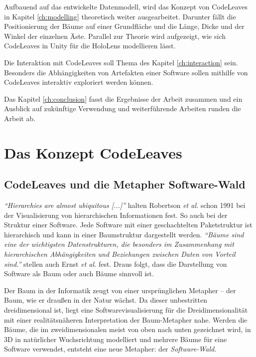 Aufbauend auf das entwickelte Datenmodell, wird das Konzept von CodeLeaves in Kapitel \ref{ch:modelling} theoretisch weiter ausgearbeitet. Darunter fällt die Positionierung der Bäume auf einer Grundfläche und die Länge, Dicke und der Winkel der einzelnen Äste. Parallel zur Theorie wird aufgezeigt, wie sich CodeLeaves in Unity für die HoloLens modellieren lässt.

Die Interaktion mit CodeLeaves soll Thema des Kapitel \ref{ch:interaction} sein. Besonders die Abhängigkeiten von Artefakten einer Software sollen mithilfe von CodeLeaves interaktiv exploriert werden können.

Das Kapitel \ref{ch:conclusion} fasst die Ergebnisse der Arbeit zusammen und ein Ausblick auf zukünftige Verwendung und weiterführende Arbeiten runden die Arbeit ab.

\chapter{Das Konzept CodeLeaves}
\label{ch:concept}

\section{CodeLeaves und die Metapher Software-Wald}
\label{sec:idea}

\emph{``Hierarchies are almost ubiquitous [...]''} \cite{robertson1991cone} halten Robertson \emph{et al.}
 schon 1991 bei der Visualisierung von hierarchischen Informationen fest. So auch bei der Struktur einer Software. Jede Software mit einer geschachtelten Paketstruktur ist hierarchisch und kann in einer Baumstruktur dargestellt werden. \emph{"`Bäume sind eine der wichtigsten Datenstrukturen, die besonders im Zusammenhang mit hierarchischen Abhängigkeiten und Beziehungen zwischen Daten von Vorteil sind."'} \cite{ernst2016grundkurs} stellen auch Ernst \emph{et al.} fest. Draus folgt, dass die Darstellung von Software als Baum oder auch Bäume sinnvoll ist.

Der Baum in der Informatik zeugt von einer ursprünglichen Metapher -- der Baum, wie er draußen in der Natur wächst. Da dieser unbestritten dreidimensional ist, liegt eine Softwarevisualisierung für die Dreidimensionalität mit einer realitätsnäheren Interpretation der Baum-Metapher nahe. Werden die Bäume, die im zweidimensionalen meist von oben nach unten gezeichnet wird, in 3D in natürlicher Wuchsrichtung modelliert und mehrere Bäume für eine Software verwendet, entsteht eine neue Metapher: der \emph{Software-Wald}.

